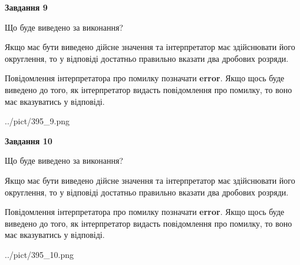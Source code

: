 \documentclass[12pt, ukrainian]{article}
\begin{document}
{\begin {Large}
{\begin {center}\textbf{Завдання 9}\end {center}}\par
Що буде виведено за виконання? \par

Якщо має бути виведено дійсне значення та інтерпретатор має здійснювати його округлення, 
то у відповіді достатньо правильно вказати два дробових розряди.

Повідомлення інтерпретатора про помилку позначати \textbf{error}.
Якщо щось буде виведено до того, як інтерпретатор видасть повідомлення про помилку, 
то воно має вказуватись у відповіді. \par

\begin{center}
	{../pict/395_9.png}
\end{center}
\newpage

{\begin {center}\textbf{Завдання 10}\end {center}}\par
Що буде виведено за виконання? \par

Якщо має бути виведено дійсне значення та інтерпретатор має здійснювати його округлення, 
то у відповіді достатньо правильно вказати два дробових розряди.

Повідомлення інтерпретатора про помилку позначати \textbf{error}.
Якщо щось буде виведено до того, як інтерпретатор видасть повідомлення про помилку, 
то воно має вказуватись у відповіді. \par

\begin{center}
	{../pict/395_10.png}
\end{center}
\newpage

\end {Large}}
\end{document}
